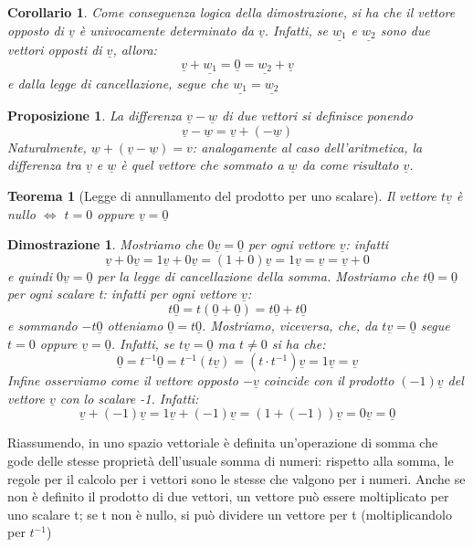 \documentclass[12pt]{article}
\newenvironment{para}{\begin{adjustwidth}{13mm}{}}{\end{adjustwidth}}
\newtheorem{Corollario}{Corollario}[subsection]
\newtheorem{Teorema}{Teorema}[subsection]
\newtheorem{Proposizione}{Proposizione}[subsection]
\newtheorem{Dimostrazione}{Dimostrazione}[subsection]
\begin{document}
\begin{para}
\begin{Corollario}
Come conseguenza logica della dimostrazione, si ha che il vettore opposto di $\underline{v}$ è univocamente determinato da $\underline{v}$. Infatti, se $\underline{w_1}$ e $\underline{w_2}$ sono due vettori opposti di $\underline{v}$, allora: $$\underline{v}+\underline{w_1} = \underline{0} = \underline{w_2} + \underline{v}$$ e dalla legge di cancellazione, segue che $\underline{w_1} = \underline{w_2}$
\end{Corollario}

\begin{Proposizione}
La differenza $\underline{v}-\underline{w}$ di due vettori si definisce ponendo $$\underline{v}-\underline{w} = \underline{v} + (-\underline{w})$$
Naturalmente, $\underline{w} + (\underline{v}-\underline{w}) = v$: analogamente al caso dell'aritmetica, la differenza tra $\underline{v}$ e $\underline{w}$ è quel vettore che sommato a $\underline{w}$ da come risultato $\underline{v}$.
\end{Proposizione}

\begin{Teorema} [Legge di annullamento del prodotto per uno scalare]
Il vettore $t\underline{v}$ è nullo $\Leftrightarrow$ $t = 0$ oppure $\underline{v} = \underline{0}$
\end{Teorema}
\begin{Dimostrazione}
Mostriamo che $0\underline{v} = \underline{0}$ per ogni vettore $\underline{v}$: infatti $$\underline{v} + 0\underline{v}=1\underline{v}+0\underline{v}=(1+0)\underline{v}=1\underline{v}=\underline{v}=\underline{v}+0$$
e quindi $0\underline{v}=\underline{0}$ per la legge di cancellazione della somma. \newline
Mostriamo che $t\underline{0} = \underline{0}$ per ogni scalare t: infatti per ogni vettore $\underline{v}$: $$t\underline{0}=t(\underline{0}+\underline{0}) = t\underline{0}+t\underline{0}$$ e sommando $-t\underline{0}$ otteniamo $\underline{0} = t\underline{0}$.
\newline Mostriamo, viceversa, che, da $t\underline{v} =  \underline{0}$ segue $t = 0$ oppure $\underline{v} = \underline{0}$. Infatti, se $t\underline{v}=\underline{0}$ ma $t \neq 0$ si ha che: $$\underline{0} = t^{-1}\underline{0} = t^{-1}(t\underline{v})=(t \cdot t^{-1})\underline{v} = 1\underline{v} = \underline{v}$$ Infine osserviamo come il vettore opposto $-\underline{v}$ coincide con il prodotto $(-1)\underline{v}$ del vettore $\underline{v}$ con lo scalare -1. Infatti:
$$\underline{v} + (-1)\underline{v} = 1\underline{v} + (-1)\underline{v} = (1 + (-1))\underline{v} = 0\underline{v} = \underline{0}$$
\end{Dimostrazione}
Riassumendo, in uno spazio vettoriale è definita un'operazione di somma che gode delle stesse proprietà dell'usuale somma di numeri: rispetto alla somma, le regole per il calcolo per i vettori sono le stesse che valgono per i numeri. Anche se non è definito il prodotto di due vettori, un vettore può essere moltiplicato per uno scalare t; se t non è nullo, si può dividere un vettore per t (moltiplicandolo per $t^{-1}$)
\newpage

\end{para}
\end{document}
